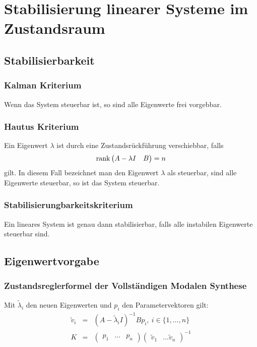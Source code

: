 \chapter{Stabilisierung linearer Systeme im Zustandsraum}
\section{Stabilisierbarkeit}
\subsection{Kalman Kriterium}
Wenn das System steuerbar ist, so sind alle Eigenwerte frei vorgebbar.

\subsection{Hautus Kriterium}
Ein Eigenwert $\lambda$ ist durch eine Zustandsrückführung verschiebbar, falls
\begin{equation}
    \operatorname*{rank} \begin{pmatrix} A-\lambda I & B \end{pmatrix} = n
\end{equation}
gilt. In diesem Fall bezeichnet man den Eigenwert $\lambda$ als steuerbar, sind alle Eigenwerte steuerbar,
so ist das System steuerbar.

\subsection{Stabilisierungbarkeitskriterium}
Ein lineares System ist genau dann stabilisierbar, falls alle instabilen Eigenwerte steuerbar sind.

\section{Eigenwertvorgabe}
\subsection{Zustandsreglerformel der Vollständigen Modalen Synthese}
Mit $\tilde{\lambda}_i$ den neuen Eigenwerten und $p_i$ den Parametervektoren gilt:
\begin{eqnarray}
    \tilde{v}_i &=& {(A-\tilde{\lambda}_i I)}^{-1} B p_i,\ i \in \{1, \ldots, n\} \\
    K &=& \begin{pmatrix} p_1 & \ldots & p_n \end{pmatrix}
            {\begin{pmatrix}\tilde{v}_1 & \ldots \tilde{v}_n \end{pmatrix}}^{-1}
\end{eqnarray}

